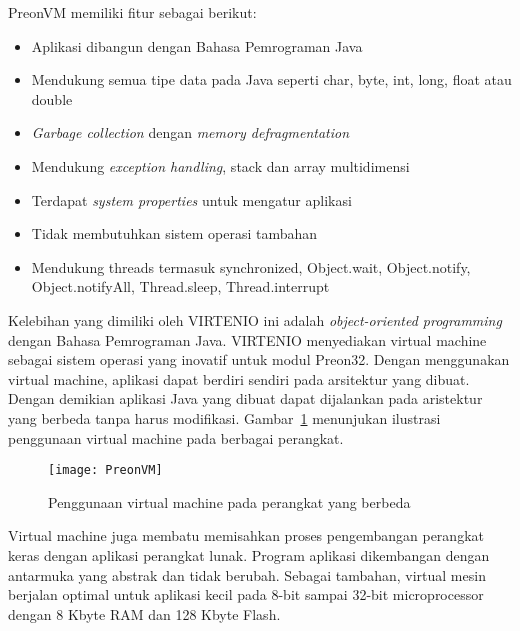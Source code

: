 PreonVM memiliki fitur sebagai berikut:
\begin{itemize}
	\item Aplikasi dibangun dengan Bahasa Pemrograman Java
	\item Mendukung semua tipe data pada Java seperti char, byte, int, long, float atau double
	\item \textit{Garbage collection} dengan \textit{memory defragmentation}
	\item Mendukung \textit{exception handling}, stack dan array multidimensi
	\item Terdapat \textit{system properties} untuk mengatur aplikasi
	\item Tidak membutuhkan sistem operasi tambahan
	\item Mendukung threads termasuk synchronized, Object.wait, Object.notify, Object.notifyAll, Thread.sleep, Thread.interrupt
\end{itemize}

Kelebihan yang dimiliki oleh VIRTENIO ini adalah \textit{object-oriented programming} dengan Bahasa Pemrograman Java. VIRTENIO menyediakan virtual machine sebagai sistem operasi yang inovatif untuk modul Preon32. Dengan menggunakan virtual machine, aplikasi dapat berdiri sendiri pada arsitektur yang dibuat. Dengan demikian aplikasi Java yang dibuat dapat dijalankan pada aristektur yang berbeda tanpa harus modifikasi. Gambar~\ref{fig:PreonVM} menunjukan ilustrasi penggunaan virtual machine pada berbagai perangkat. 

\begin{figure} [H]
	\centering  
	\texttt{[image: PreonVM]}  
	\caption[Penggunaan virtual machine pada perangkat yang berbeda]{Penggunaan virtual machine pada perangkat yang berbeda} 
	\label{fig:PreonVM} 
\end{figure} 

Virtual machine juga membatu memisahkan proses pengembangan perangkat keras dengan aplikasi perangkat lunak. Program aplikasi dikembangan dengan antarmuka yang abstrak dan tidak berubah. Sebagai tambahan, virtual mesin berjalan optimal untuk aplikasi kecil pada 8-bit sampai 32-bit microprocessor dengan 8 Kbyte RAM dan 128 Kbyte Flash.  

